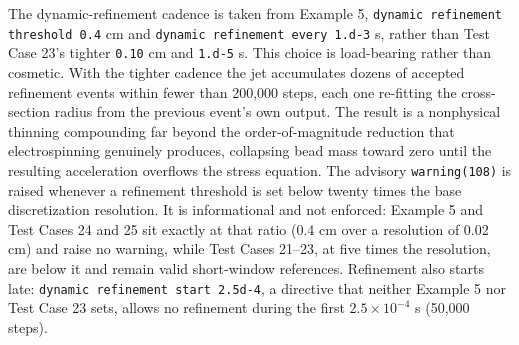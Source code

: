 The dynamic-refinement cadence is taken from Example 5,
\texttt{dynamic refinement threshold 0.4} cm and
\texttt{dynamic refinement every 1.d-3} s, rather than Test Case 23's tighter
\texttt{0.10} cm and \texttt{1.d-5} s.  This choice is load-bearing rather
than cosmetic.  With the tighter cadence the jet accumulates dozens of
accepted refinement events within fewer than 200,000 steps, each one
re-fitting the cross-section radius from the previous event's own output.  The
result is a nonphysical thinning compounding far beyond the
order-of-magnitude reduction that electrospinning genuinely produces,
collapsing bead mass toward zero until the resulting acceleration overflows
the stress equation.  The advisory \texttt{warning(108)} is raised whenever a
refinement threshold is set below twenty times the base discretization
resolution.  It is informational and not enforced: Example 5 and Test Cases
24 and 25 sit exactly at that ratio (0.4 cm over a resolution of 0.02 cm)
and raise no warning, while Test Cases 21--23, at five times the resolution,
are below it and remain valid short-window references.  Refinement also
starts late: \texttt{dynamic refinement start 2.5d-4}, a directive that
neither Example 5 nor Test Case 23 sets, allows no refinement during the
first $2.5\times10^{-4}$ s (50,000 steps).

